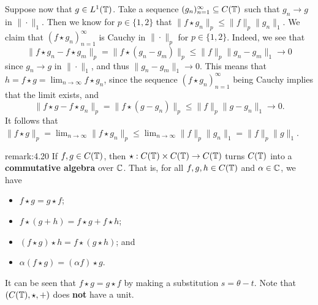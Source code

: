 \begin{pf}
\begin{enumerate}[(1)]
        Suppose now that $g \in L^1(\mathbb{T})$. Take a sequence $(g_n)_{n=1}^\infty 
        \subseteq C(\mathbb{T})$ such that $g_n \to g$ in $\|\cdot\|_1$. 
        Then we know for $p \in \{1, 2\}$ that 
        $\|f \star g_n\|_p \leq \|f\|_p \|g_n\|_1$.
        We claim that $(f \star g_n)_{n=1}^\infty$ is Cauchy in $\|\cdot\|_p$ 
        for $p \in \{1, 2\}$. Indeed, we see that 
        \[ \|f \star g_n - f \star g_m\|_p = \|f \star (g_n - g_m)\|_p 
        \leq \|f\|_p \|g_n - g_m\|_1 \to 0 \] 
        since $g_n \to g$ in $\|\cdot\|_1$, and thus $\|g_n - g_m\|_1 \to 0$. 
        This means that $h = f \star g = \lim_{n\to\infty} f \star g_n$, 
        since the sequence $(f \star g_n)_{n=1}^\infty$ being Cauchy 
        implies that the limit exists, and 
        \[ \|f \star g - f \star g_n\|_p = \|f \star (g - g_n)\|_p 
        \leq \|f\|_p \|g - g_n\|_1 \to 0. \] 
        It follows that 
        $\|f \star g\|_p = \lim_{n\to\infty} \|f \star g_n\|_p 
        \leq \lim_{n\to\infty} \|f\|_p \|g_n\|_1 = \|f\|_p \|g\|_1$. \qedhere  
    \end{enumerate}
\end{pf}

\begin{remark}{remark:4.20}
    If $f, g \in C(\mathbb{T})$, then $\star : C(\mathbb{T}) \times C(\mathbb{T}) \to C(\mathbb{T})$ 
    turns $C(\mathbb{T})$ into a {\bf commutative algebra} over $\mathbb{C}$. That is, 
    for all $f, g, h \in C(\mathbb{T})$ and $\alpha \in \mathbb{C}$, we have 
    \begin{itemize}
        \item $f \star g = g \star f$; 
        \item $f \star (g + h) = f \star g + f \star h$; 
        \item $(f \star g) \star h = f \star (g \star h)$; and 
        \item $\alpha(f \star g) = (\alpha f) \star g$. 
    \end{itemize}
    It can be seen that $f \star g = g \star f$ by making a substitution 
    $s = \theta - t$. Note that $(C(\mathbb{T}), \star, +)$ does {\bf not} have a unit.
\end{remark}

